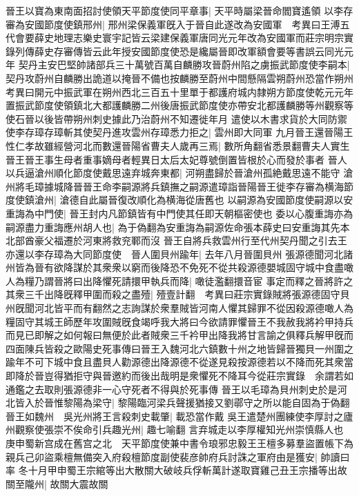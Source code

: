 晉王以寶為東南面招討使領天平節度使同平章事|{
	天平時屬梁晉命閻寶遙領}
以李存審為安國節度使鎮邢州|{
	邢州梁保義軍旣入于晉自此遂改為安國軍　考異曰王溥五代會要薛史地理志樂史寰宇記皆云梁建保義軍唐同光元年改為安國軍而莊宗明宗實錄列傳薛史存審傳皆云此年授安國節度使恐是纔屬晉即改軍額會要等書誤云同光元年}
契丹主安巴堅帥諸部兵三十萬號百萬自麟勝攻晉蔚州陷之虜振武節度使李嗣本|{
	契丹攻蔚州自麟勝出詭道以掩晉不備也按麟勝至蔚州中間懸隔雲朔蔚州恐當作朔州　考異曰開元中振武軍在朔州西北三百五十里單于都護府城内隸朔方節度使乾元元年置振武節度使領鎮北大都護麟勝二州後唐振武節度使亦帶安北都護麟勝等州觀察等使石晉以後皆帶朔州刺史據此乃治蔚州不知遷徙年月}
遣使以木書求貨於大同防禦使李存璋存璋斬其使契丹進攻雲州存璋悉力拒之|{
	雲州即大同軍}
九月晉王還晉陽王性仁孝故雖經營河北而數還晉陽省曹夫人歲再三焉|{
	數所角翻省悉景翻曹夫人實生晉王晉王事生母者重事嫡母者輕異日太后太妃尊號倒置皆根於心而發於事者}
晉人以兵逼滄州順化節度使戴思遠弃城奔東都|{
	河朔盡歸於晉滄州孤絶戴思遠不能守}
滄州將毛璋據城降晉晉王命李嗣源將兵鎮撫之嗣源遣璋詣晉陽晉王徙李存審為横海節度使鎮滄州|{
	滄德自此屬晉復改順化為横海從唐舊也}
以嗣源為安國節度使嗣源以安重誨為中門使|{
	晉王封内凡節鎮皆有中門使其任即天朝樞密使也}
委以心腹重誨亦為嗣源盡力重誨應州胡人也|{
	為于偽翻為安重誨為嗣源佐命張本薛史曰安重誨其先本北部酋豪父福遷於河東將救兖鄆而沒}
晉王自將兵救雲州行至代州契丹聞之引去王亦還以李存璋為大同節度使　晉人圍貝州踰年|{
	去年八月晉圍貝州}
張源德聞河北諸州皆為晉有欲降謀於其衆衆以窮而後降恐不免死不從共殺源德嬰城固守城中食盡噉人為糧乃謂晉將曰出降懼死請擐甲執兵而降|{
	噉徒濫翻擐音宦}
事定而釋之晉將許之其衆三千出降旣釋甲圍而殺之盡殪|{
	殪壹計翻　考異曰莊宗實錄賊將張源德固守貝州旣聞河北皆平而有翻然之志詢謀於衆羣賊皆河南人懼其歸罪不從因殺源德噉人為糧固守其城王師歷年攻圍賊旣食竭呼我大將曰今欲請罪懼晉王不我赦我將衿甲持兵而見已即解之如何報曰無便於此者賊衆三千衿甲出降我將甘言諭之俱釋兵解甲旣而四面陳兵皆殺之歐陽史死事傳曰晉王入魏河北六鎮數十州之地皆歸晉獨貝一州圍之踰年不可下城中食且盡貝人勸源德出降源德不從遂見殺按源德若以不降而死其衆當即降於晉豈得猶拒守與晉邀約而後出哉明是衆懼死不降耳今從莊宗實錄　余謂若如通鑑之去取則張源德非一心守死者不得與於死事傳}
晉王以毛璋為貝州刺史於是河北皆入於晉惟黎陽為梁守|{
	黎陽臨河梁兵聲援猶接又劉鄩守之所以能自固為于偽翻}
晉王如魏州　吳光州將王言殺刺史載肇|{
	載恐當作戴}
吳王遣楚州團練使李厚討之廬州觀察使張崇不俟命引兵趣光州|{
	趣七喻翻}
言弃城走以李厚權知光州崇慎縣人也　庚申蜀新宫成在舊宫之北　天平節度使兼中書令琅邪忠毅王王檀多募羣盜置帳下為親兵己卯盜乘檀無備突入府殺檀節度副使裴彦帥府兵討誅之軍府由是獲安|{
	帥讀曰率}
冬十月甲申蜀王宗綰等出大散關大破岐兵俘斬萬計遂取寶雞己丑王宗播等出故關至隴州|{
	故關大震故關}
